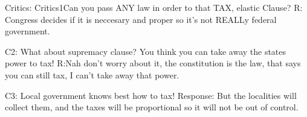 \documentclass[12pt]{report}
\numberwithin{equation}{section}
\begin{document}
Critics:
Critics1Can you pass ANY law in order to that TAX, elastic Clause? R: Congress decides if it is neccesary and proper so it's not REALLy federal government.  

C2: What about supremacy clause? You think you can take away the states power to tax! R:Nah don't worry about it, the constitution is the law, that says you can still tax, I can't take away that power. 

C3: Local government knows best how to tax! Response: But the localities will collect them, and the taxes will be proportional so it will not be out of control. 





\end{document}
